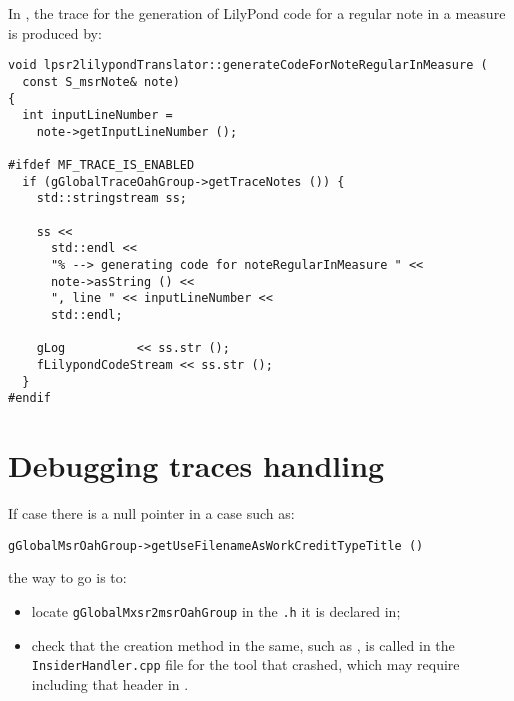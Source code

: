 In , the trace for the generation of LilyPond code for a regular note in a measure is produced by:
\begin{lstlisting}[language=CPlusPlus]
void lpsr2lilypondTranslator::generateCodeForNoteRegularInMeasure (
  const S_msrNote& note)
{
  int inputLineNumber =
    note->getInputLineNumber ();

#ifdef MF_TRACE_IS_ENABLED
  if (gGlobalTraceOahGroup->getTraceNotes ()) {
    std::stringstream ss;

    ss <<
      std::endl <<
      "% --> generating code for noteRegularInMeasure " <<
      note->asString () <<
      ", line " << inputLineNumber <<
      std::endl;

    gLog          << ss.str ();
    fLilypondCodeStream << ss.str ();
  }
#endif

\end{lstlisting}


\section{Debugging traces handling}

If case there is a null pointer in a case such as:
\begin{lstlisting}[language=CPlusPlus]
    gGlobalMsrOahGroup->getUseFilenameAsWorkCreditTypeTitle ()
\end{lstlisting}

the way to go is to:%
\begin{itemize}
\item locate {\tt gGlobalMxsr2msrOahGroup} in the {\tt *.h} it is declared in;
\item check that the creation method in the same, such as , is called in the {\tt *InsiderHandler.cpp} file for the tool that crashed, which may require including that  header in .
\end{itemize}

